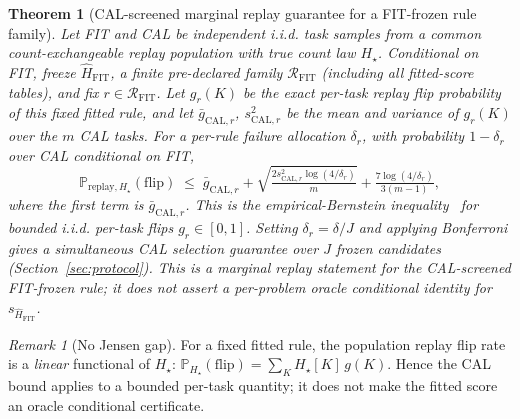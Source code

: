 \documentclass{article}
\newtheorem{theorem}{Theorem}
\theoremstyle{definition}
\theoremstyle{remark}
\newtheorem{remark}{Remark}
\newcommand{\flip}{\mathrm{flip}}
\newcommand{\calD}{\mathrm{CAL}}
\newcommand{\trueH}{H_\star}
\newcommand{\fitscore}{s_{\widehat H_{\mathrm{FIT}}}}
\renewcommand{\P}{\mathbb{P}}
\begin{document}
\begin{theorem}[CAL-screened marginal replay guarantee for a FIT-frozen rule family]
\label{thm:pop}
Let FIT and CAL be independent i.i.d. task samples from a common
count-exchangeable replay population with true count law $\trueH$. Conditional
on FIT, freeze $\widehat H_{\mathrm{FIT}}$, a finite pre-declared family
$\mathcal R_{\mathrm{FIT}}$ (including all fitted-score tables), and fix
$r\in\mathcal R_{\mathrm{FIT}}$. Let $g_r(K)$ be the exact per-task replay
flip probability of this \emph{fixed fitted rule}, and let
$\bar g_{\calD,r}$, $s^2_{\calD,r}$ be the mean and variance of $g_r(K)$ over
the $m$ CAL tasks.
For a per-rule failure allocation $\delta_r$, with probability
$1-\delta_r$ over CAL conditional on FIT,
\[
\P_{\text{replay},\trueH}(\flip) \;\le\; \bar g_{\calD,r}
+ \sqrt{\tfrac{2 s^2_{\calD,r}\log(4/\delta_r)}{m}}
+ \tfrac{7\log(4/\delta_r)}{3(m-1)},
\]
where the first term is $\bar g_{\calD,r}$.  This is the
empirical-Bernstein inequality~\citep{maurer2009eb} for bounded i.i.d.
per-task flips $g_r\in[0,1]$. Setting $\delta_r=\delta/J$ and applying
Bonferroni gives a simultaneous CAL selection guarantee over $J$ frozen
candidates (Section~\ref{sec:protocol}). This is a marginal replay statement
for the CAL-screened FIT-frozen rule; it does not assert a per-problem oracle
conditional identity for $\fitscore$.
\end{theorem}
\begin{remark}[No Jensen gap]
For a fixed fitted rule, the population replay flip rate is a \emph{linear}
functional of $\trueH$: $\P_{\trueH}(\flip)=\sum_K \trueH[K]\,g(K)$. Hence the
CAL bound applies to a bounded per-task quantity; it does not make the fitted
score an oracle conditional certificate.
\end{remark}
\end{document}
